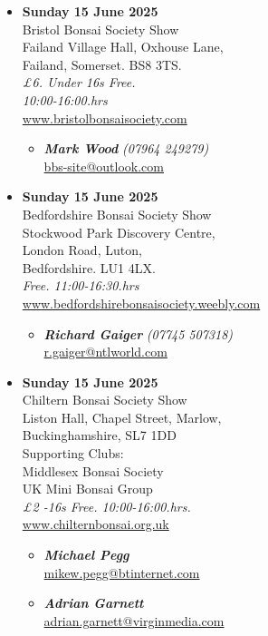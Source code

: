 \begin{itemize}
    \item \textbf{Sunday 15 June 2025}
    \\
    Bristol Bonsai Society Show \\
    Failand Village Hall, Oxhouse Lane, \\
    Failand, Somerset. BS8 3TS.
    \\
    \emph{£6. Under 16s Free.} \\
    \emph{10:00-16:00.hrs}
    \\
    \href{http://www.bristolbonsaisociety.com/}{www.bristolbonsaisociety.com}
    \begin{itemize}
        \item \textbf{\emph{Mark Wood}} \emph{(07964 249279)} \\
        \href{mailto:bbs-site@outlook.com}{bbs-site@outlook.com} 
    \end{itemize}

    \item \textbf{Sunday 15 June 2025}
    \\
    Bedfordshire Bonsai Society Show \\
    Stockwood Park Discovery Centre, \\
    London Road, Luton, \\
    Bedfordshire. LU1 4LX.
    \\
    \emph{Free. 11:00-16:30.hrs}
    \\
    \href{https://www.bedfordshirebonsaisociety.weebly.com}{www.bedfordshirebonsaisociety.weebly.com}
    \begin{itemize}
        \item \textbf{\emph{Richard Gaiger}} \emph{(07745 507318)} \\
        \href{mailto:r.gaiger@ntlworld.com}{r.gaiger@ntlworld.com} 
    \end{itemize}

    \item \textbf{Sunday 15 June 2025}
    \\
    Chiltern Bonsai Society Show \\
    Liston Hall, Chapel Street, Marlow, \\
    Buckinghamshire, SL7 1DD \\
    Supporting Clubs: \\
    Middlesex Bonsai Society \\
    UK Mini Bonsai Group
    \\
    \emph{£2 -16s Free. 10:00-16:00.hrs.}
    \\
    \href{https://www.chilternbonsai.org.uk}{www.chilternbonsai.org.uk}
    \begin{itemize}
        \item \textbf{\emph{Michael Pegg}} \\
        \href{mailto:mikew.pegg@btinternet.com}{mikew.pegg@btinternet.com} 
        \item \textbf{\emph{Adrian Garnett}} \\
        \href{mailto:adrian.garnett@virginmedia.com}{adrian.garnett@virginmedia.com} 
    \end{itemize}


\end{itemize}
